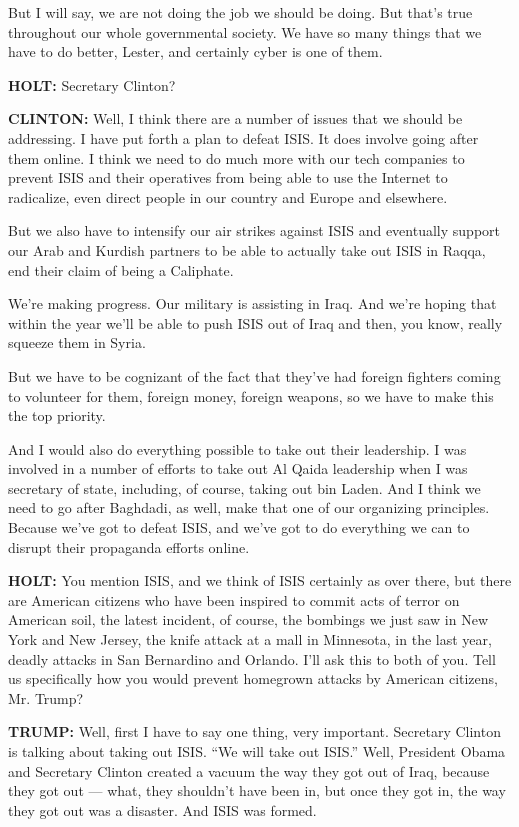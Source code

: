 But I will say, we are not doing the job we should be doing. But that's
true throughout our whole governmental society. We have so many things
that we have to do better, Lester, and certainly cyber is one of them.

\textbf{HOLT:} Secretary Clinton?

\textbf{CLINTON:} Well, I think there are a number of issues that we
should be addressing. I have put forth a plan to defeat ISIS. It does
involve going after them online. I think we need to do much more with
our tech companies to prevent ISIS and their operatives from being able
to use the Internet to radicalize, even direct people in our country and
Europe and elsewhere.

But we also have to intensify our air strikes against ISIS and
eventually support our Arab and Kurdish partners to be able to actually
take out ISIS in Raqqa, end their claim of being a Caliphate.

We're making progress. Our military is assisting in Iraq. And we're
hoping that within the year we'll be able to push ISIS out of Iraq and
then, you know, really squeeze them in Syria.

But we have to be cognizant of the fact that they've had foreign
fighters coming to volunteer for them, foreign money, foreign weapons,
so we have to make this the top priority.

And I would also do everything possible to take out their leadership. I
was involved in a number of efforts to take out Al Qaida leadership when
I was secretary of state, including, of course, taking out bin Laden.
And I think we need to go after Baghdadi, as well, make that one of our
organizing principles. Because we've got to defeat ISIS, and we've got
to do everything we can to disrupt their propaganda efforts online.

\textbf{HOLT:} You mention ISIS, and we think of ISIS certainly as over
there, but there are American citizens who have been inspired to commit
acts of terror on American soil, the latest incident, of course, the
bombings we just saw in New York and New Jersey, the knife attack at a
mall in Minnesota, in the last year, deadly attacks in San Bernardino
and Orlando. I'll ask this to both of you. Tell us specifically how you
would prevent homegrown attacks by American citizens, Mr. Trump?

\textbf{TRUMP:} Well, first I have to say one thing, very important.
Secretary Clinton is talking about taking out ISIS. ``We will take out
ISIS.'' Well, President Obama and Secretary Clinton created a vacuum the
way they got out of Iraq, because they got out --- what, they shouldn't
have been in, but once they got in, the way they got out was a disaster.
And ISIS was formed.

